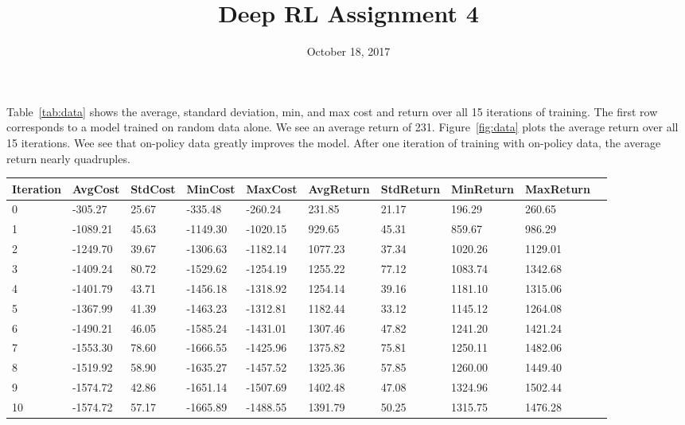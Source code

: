 \documentclass{mwhittaker}
\title{Deep RL Assignment 4}
\date{October 18, 2017}
\newcommand{\tabref}[1]{Table~\ref{tab:#1}}
\newcommand{\figref}[1]{Figure~\ref{fig:#1}}
\begin{document}
\maketitle
\tabref{data} shows the average, standard deviation, min, and max cost and
return over all 15 iterations of training. The first row corresponds to a model
trained on random data alone. We see an average return of 231. \figref{data}
plots the average return over all 15 iterations. Wee see that on-policy data
greatly improves the model. After one iteration of training with on-policy
data, the average return nearly quadruples.

\begin{table}[ht]
  \footnotesize
  \begin{tabular}{|l|l|l|l|l|l|l|l|l|l|}
    \hline
    Iteration & AvgCost  & StdCost & MinCost  & MaxCost  & AvgReturn & StdReturn & MinReturn & MaxReturn \\\hline
    0         & -305.27  & 25.67   & -335.48  & -260.24  & 231.85    & 21.17     & 196.29    & 260.65\\\hline
    1         & -1089.21 & 45.63   & -1149.30 & -1020.15 & 929.65    & 45.31     & 859.67    & 986.29\\\hline
    2         & -1249.70 & 39.67   & -1306.63 & -1182.14 & 1077.23   & 37.34     & 1020.26   & 1129.01\\\hline
    3         & -1409.24 & 80.72   & -1529.62 & -1254.19 & 1255.22   & 77.12     & 1083.74   & 1342.68\\\hline
    4         & -1401.79 & 43.71   & -1456.18 & -1318.92 & 1254.14   & 39.16     & 1181.10   & 1315.06\\\hline
    5         & -1367.99 & 41.39   & -1463.23 & -1312.81 & 1182.44   & 33.12     & 1145.12   & 1264.08\\\hline
    6         & -1490.21 & 46.05   & -1585.24 & -1431.01 & 1307.46   & 47.82     & 1241.20   & 1421.24\\\hline
    7         & -1553.30 & 78.60   & -1666.55 & -1425.96 & 1375.82   & 75.81     & 1250.11   & 1482.06\\\hline
    8         & -1519.92 & 58.90   & -1635.27 & -1457.52 & 1325.36   & 57.85     & 1260.00   & 1449.40\\\hline
    9         & -1574.72 & 42.86   & -1651.14 & -1507.69 & 1402.48   & 47.08     & 1324.96   & 1502.44\\\hline
    10        & -1574.72 & 57.17   & -1665.89 & -1488.55 & 1391.79   & 50.25     & 1315.75   & 1476.28\\\hline

\end{tabular}
\end{table}
\end{document}
